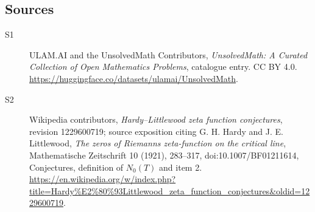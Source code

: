 \documentclass[11pt]{article}
\begin{document}
\subsection{Sources}
\begin{description}
\item[\hypertarget{source:statement:1}{S1}] ULAM.AI and the UnsolvedMath Contributors, \emph{UnsolvedMath: A Curated Collection of Open Mathematics Problems}, catalogue entry. CC BY 4.0. \url{https://huggingface.co/datasets/ulamai/UnsolvedMath}.
\item[\hypertarget{source:statement:2}{S2}] Wikipedia contributors, \emph{Hardy--Littlewood zeta function conjectures}, revision 1229600719; source exposition citing G. H. Hardy and J. E. Littlewood, \emph{The zeros of Riemann\textquotesingle s zeta-function on the critical line}, Mathematische Zeitschrift 10 (1921), 283--317, doi:10.1007/BF01211614, Conjectures, definition of $N_0(T)$ and item 2. \url{https://en.wikipedia.org/w/index.php?title=Hardy%E2%80%93Littlewood_zeta_function_conjectures&oldid=1229600719}.
\end{description}
\label{end:statement}
\end{document}
